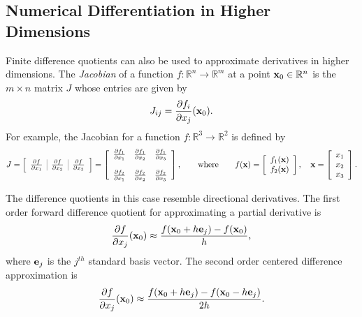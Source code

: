 \subsection*{Numerical Differentiation in Higher Dimensions} %

Finite difference quotients can also be used to approximate derivatives in higher dimensions.
The \emph{Jacobian} of a function $f:\mathbb{R}^n \rightarrow \mathbb{R}^m$ at a point $\mathbf{x}_0 \in \mathbb{R}^n$ is the $m \times n$ matrix $J$ whose entries are given by
\begin{equation*}
J_{ij} = \frac{\partial f_i}{\partial x_j}(\mathbf{x}_0).
\end{equation*}
For example, the Jacobian for a function $f:\mathbb{R}^3 \rightarrow \mathbb{R}^2$ is defined by
\[
J = \left[\begin{array}{c|c|c}
\arrayrulecolor{gray}
\frac{\partial f}{\partial x_1}&\frac{\partial f}{\partial x_2}&\frac{\partial f}{\partial x_3}
\end{array}\right]
=
\left[\begin{array}{ccc}
\frac{\partial f_1}{\partial x_1}&\frac{\partial f_1}{\partial x_2}&\frac{\partial f_1}{\partial x_3}
\\ \\
\frac{\partial f_2}{\partial x_1}&\frac{\partial f_2}{\partial x_2}&\frac{\partial f_2}{\partial x_3}
\end{array}\right],
\qquad
\text{where}
\qquad
f(\x) =
\left[\begin{array}{c}
f_1(\x) \\ f_2(\x)
\end{array}\right],
\quad
\x = \left[\begin{array}{c}
x_1 \\ x_2 \\ x_3
\end{array}\right].
\]

The difference quotients in this case resemble directional derivatives.
The first order forward difference quotient for approximating a partial derivative is
\[
\frac{\partial f}{\partial x_j}(\mathbf{x}_0) \approx \frac{f(\mathbf{x}_0 + h\mathbf{e}_j) - f(\mathbf{x}_0)}{h},
\]
where $\mathbf{e}_j$ is the $j^{th}$ standard basis vector.
The second order centered difference approximation is
\begin{equation}
\frac{\partial f}{\partial x_j}(\mathbf{x}_0) \approx \frac{f(\mathbf{x}_0 + h\mathbf{e}_j) - f(\mathbf{x}_0 - h\mathbf{e}_j)}{2h}.
\label{eq:centered-quotient-high-dimension}
\end{equation}


